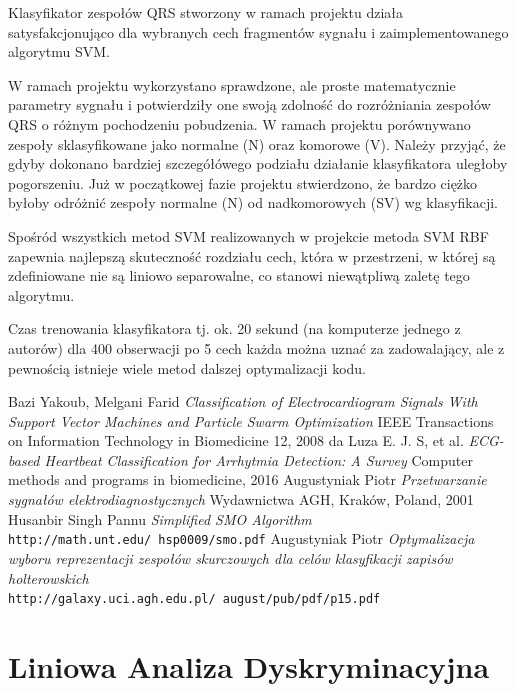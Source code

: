 \documentclass[[10pt,a4paper]{article}
\begin{document}
Klasyfikator zespołów QRS stworzony w ramach projektu działa satysfakcjonująco dla wybranych cech fragmentów sygnału i zaimplementowanego algorytmu SVM.

W ramach projektu wykorzystano sprawdzone, ale proste matematycznie parametry sygnału i potwierdziły one swoją zdolność do rozróżniania zespołów QRS o różnym pochodzeniu pobudzenia. W ramach projektu porównywano zespoły sklasyfikowane jako normalne (N) oraz komorowe (V). Należy przyjąć, że gdyby dokonano bardziej szczegółówego podziału działanie klasyfikatora uległoby pogorszeniu. Już w początkowej fazie projektu stwierdzono, że bardzo ciężko byłoby odróżnić zespoły normalne (N) od nadkomorowych (SV) wg klasyfikacji. \cite{survey}

Spośród wszystkich metod SVM realizowanych w projekcie metoda SVM RBF zapewnia najlepszą skuteczność rozdziału cech, która w przestrzeni, w której są zdefiniowane nie są liniowo separowalne, co stanowi niewątpliwą zaletę tego algorytmu. \cite{melgani}

Czas trenowania klasyfikatora tj. ok. 20 sekund (na komputerze jednego z autorów) dla 400 obserwacji po 5 cech każda można uznać za zadowalający, ale z pewnością istnieje wiele metod dalszej optymalizacji kodu.

\begin{thebibliography}{9}
	
	Bazi Yakoub, Melgani Farid
	\textit{Classification of Electrocardiogram Signals With Support Vector Machines and Particle Swarm Optimization} 
	IEEE Transactions on Information Technology in Biomedicine 12, 2008
	da Luza E. J. S, et al.
	\textit{ECG-based Heartbeat Classification for Arrhytmia Detection: A Survey} 
	Computer methods and programs in biomedicine, 2016
	Augustyniak Piotr
	\textit{Przetwarzanie sygnałów elektrodiagnostycznych} 
	Wydawnictwa AGH, Kraków, Poland, 2001
	Husanbir Singh Pannu
	\textit{Simplified SMO Algorithm} 
	\\\texttt{http://math.unt.edu/~hsp0009/smo.pdf}
	Augustyniak Piotr
	\textit{Optymalizacja wyboru reprezentacji zespołów skurczowych dla celów klasyfikacji zapisów holterowskich} 
	\\\texttt{http://galaxy.uci.agh.edu.pl/~august/pub/pdf/p15.pdf}
	
\end{thebibliography}
\newpage


\section{Liniowa Analiza Dyskryminacyjna}
\end{document}

